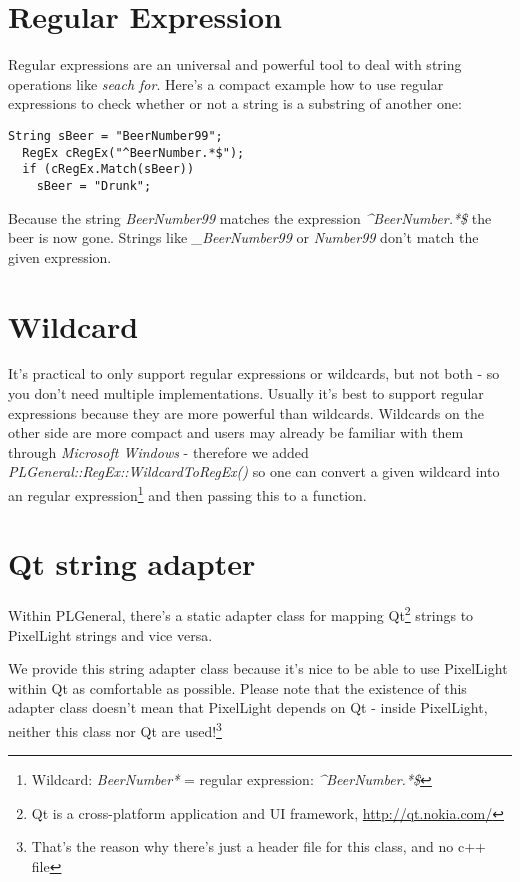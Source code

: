 \section{Regular Expression}
Regular expressions are an universal and powerful tool to deal with string operations like \emph{seach for}. Here's a compact example how to use regular expressions to check whether or not a string is a substring of another one:

\begin{lstlisting}[caption=Regular expression example]
  String sBeer = "BeerNumber99";
  RegEx cRegEx("^BeerNumber.*$");
  if (cRegEx.Match(sBeer))
    sBeer = "Drunk";
\end{lstlisting}

Because the string \emph{BeerNumber99} matches the expression \emph{\textasciicircum BeerNumber.*\$} the beer is now gone. Strings like \emph{\_BeerNumber99} or \emph{Number99} don't match the given expression.




\section{Wildcard}
It's practical to only support regular expressions or wildcards, but not both - so you don't need multiple implementations. Usually it's best to support regular expressions because they are more powerful than wildcards. Wildcards on the other side are more compact and users may already be familiar with them through \emph{Microsoft Windows} - therefore we added \emph{PLGeneral::RegEx::WildcardToRegEx()} so one can convert a given wildcard into an regular expression\footnote{Wildcard: \emph{BeerNumber*} = regular expression: \emph{\textasciicircum BeerNumber.*\$}} and then passing this to a function.




\section{Qt string adapter}
Within PLGeneral, there's a static adapter class for mapping Qt\footnote{Qt is a cross-platform application and UI framework, \url{http://qt.nokia.com/}} strings to PixelLight strings and vice versa.

We provide this string adapter class because it's nice to be able to use PixelLight within Qt as comfortable as possible. Please note that the existence of this adapter class doesn't mean that PixelLight depends on Qt - inside PixelLight, neither this class nor Qt are used!\footnote{That's the reason why there's just a header file for this class, and no c++ file}

